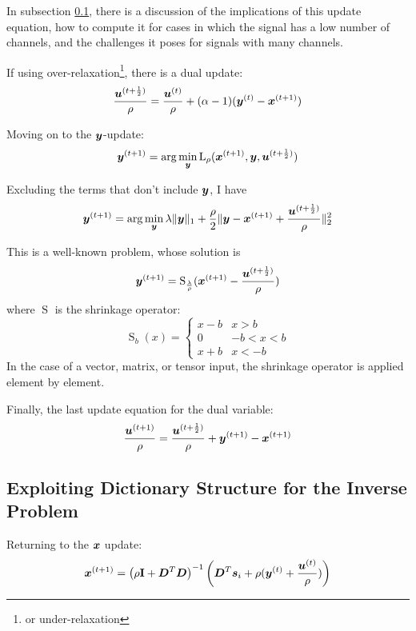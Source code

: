 In subsection \ref{subsection:SC xupdate}, there is a discussion of the implications of this update equation, how to compute it for cases in which the signal has a low number of channels, and the challenges it poses for signals with many channels.

If using over-relaxation\footnote{or under-relaxation}, there is a dual update:
\begin{equation}
\frac{\bm{u}^{(t + \frac{1}{2})}}{\rho} = \frac{\bm{u}^{(t)}}{\rho} + (\alpha - 1)(\bm{y}^{(t)} - \bm{x}^{(t + 1)})
\end{equation}

Moving on to the $\bm{y}$-update:
\begin{equation}
\bm{y}^{(t + 1)} = \arg\min_{\bm{y}} \operatorname{L}_{\rho}(\bm{x}^{(t + 1)},\bm{y},\bm{u}^{(t + \frac{1}{2})})
\end{equation}

Excluding the terms that don't include $\bm{y}$, I have
\begin{equation}
\bm{y}^{(t + 1)} = \arg\min_{\bm{y}} \lambda\|\bm{y}\|_1 + \frac{\rho}{2}\|\bm{y} - \bm{x}^{(t + 1)} + \frac{\bm{u}^{(t + \frac{1}{2})}}{\rho}\|_2^2
\end{equation}

This is a well-known problem, whose solution is
\begin{equation}
\bm{y}^{(t + 1)} = \operatorname{S}_{\frac{\lambda}{\rho}}(\bm{x}^{(t + 1)} - \frac{\bm{u}^{(t + \frac{1}{2})}}{\rho})
\end{equation}
where $\operatorname{S}$ is the shrinkage operator:
\begin{equation}
\operatorname{S}_{b}(x) = \begin{cases} x - b & x > b \\ 0 & -b < x < b \\ x + b & x < - b \end{cases}
\end{equation}
In the case of a vector, matrix, or tensor input, the shrinkage operator is applied element by element.

Finally, the last update equation for the dual variable:
\begin{equation}
\frac{\bm{u}^{(t + 1)}}{\rho} = \frac{\bm{u}^{(t + \frac{1}{2})}}{\rho} + \bm{y}^{(t + 1)} - \bm{x}^{(t + 1)}
\end{equation}

\subsection{Exploiting Dictionary Structure for the Inverse Problem}
\label{subsection:SC xupdate}
Returning to the $\bm{x}$ update:
\begin{equation}
\bm{x}^{(t + 1)} = \left(\rho{\bf I} + \bm{D}^T\bm{D}\right)^{-1}\left(\bm{D}^T\bm{s}_i + \rho(\bm{y}^{(t)} + \frac{\bm{u}^{(t)}}{\rho})\right)
\end{equation}

